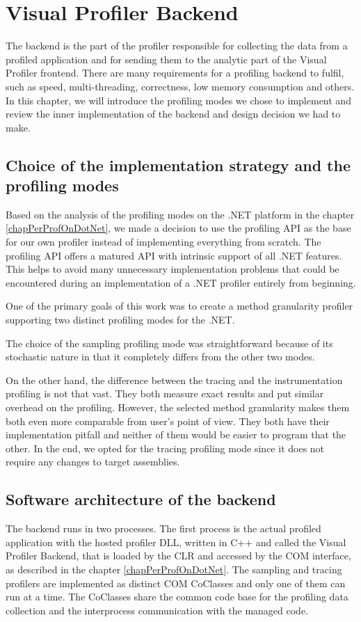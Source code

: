 \chapter{Visual Profiler Backend}
\label{chap04:chapter}
The backend is the part of the profiler responsible for collecting the data from a profiled application and for sending them to the analytic part of the Visual Profiler frontend. There are many requirements for a profiling backend to fulfil, such as speed, multi-threading, correctness, low memory consumption and others. In this chapter, we will introduce the profiling modes we chose to implement and review the inner implementation of the backend and design decision we had to make.

\section{Choice of the implementation strategy and the profiling modes}
Based on the analysis of the profiling modes on the .NET platform in the chapter \ref{chapPerProfOnDotNet}, we made a decision to use the profiling API as the base for our own profiler instead of implementing everything from scratch. The profiling API offers a 	 matured API with intrinsic support of all .NET features. This helps to avoid many unnecessary implementation problems that could be encountered during an implementation of a .NET profiler entirely from beginning.

One of the primary goals of this work was to create a method granularity profiler supporting two distinct profiling modes for the .NET.

The choice of the sampling profiling mode was straightforward because of its stochastic nature in that it completely differs from the other two modes. 

On the other hand, the difference between the tracing and the instrumentation profiling is not that vast. They both measure exact results and put similar overhead on the profiling. However, the selected method granularity makes them both even more comparable from user's point of view. They both have their implementation pitfall and neither of them would be easier to program that the other. In the end, we opted for the tracing profiling mode since it does not require any changes to target assemblies.

\section{Software architecture of the backend }
The backend runs in two processes. The first process is the actual profiled application with the hosted profiler DLL, written in C++ and called the Visual Profiler Backend, that is loaded by the CLR and accessed by the COM interface, as described in the chapter \ref{chapPerProfOnDotNet}. The sampling and tracing profilers are implemented as distinct COM CoClasses and only one of them can run at a time. The CoClasses share the common code base for the profiling data collection and the interprocess communication with the managed code.

